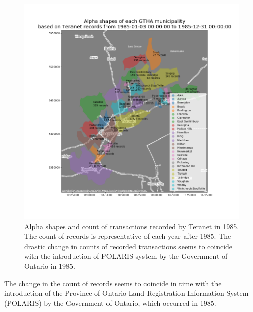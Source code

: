 \documentclass[11pt]{article}
\begin{document}
    \begin{figure}[hbt!]
        \centering
        \includegraphics[width=1\linewidth,trim=0.5 0.5 0.5 0.5,clip]{img/as_1985-01-03_1985-12-31.png}
        \caption{Alpha shapes and count of transactions recorded by Teranet in 1985.
        The count of records is representative of each year after 1985.
        The drastic change in counts of recorded transactions seems to coincide with the introduction of POLARIS system by the Government of Ontario in 1985.}
        \label{fig:teranet_as_1985}
    \end{figure}
    The change in the count of records seems to coincide in time with the introduction of the Province of Ontario Land Registration Information System (POLARIS) by the Government of Ontario, which occurred in 1985.
\end{document}
